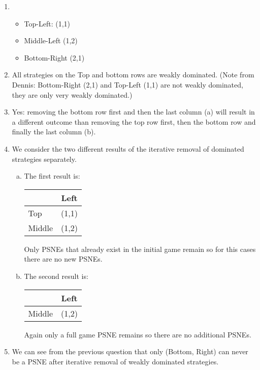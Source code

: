 \documentclass[../main.tex]{subfiles}
\begin{document}
\begin{solution}

    \begin{enumerate}
    	\item
    		\begin{itemize}
	    		\item Top-Left: (1,1)
	    		\item Middle-Left (1,2)
	    		\item Bottom-Right (2,1)
    		\end{itemize}
    	\item
    		All strategies on the Top and bottom rows are weakly dominated. (Note from Dennis:  Bottom-Right (2,1) and Top-Left (1,1) are not weakly dominated, they are only very weakly dominated.)
    	\item Yes: removing the bottom row first and then the last column (a) will result in a different outcome than removing the top row first, then the bottom row and finally the last column (b).
    	\item We consider the two different results of the iterative removal of dominated strategies separately.
			\begin{enumerate}[(a)]
				\item The first result is: \\
					\begin{center}
						\begin{tabular}{|l|c|}
							\hline
							& Left \\
							\hline
							Top & (1,1) \\
							\hline
							Middle & (1,2) \\
							\hline
						\end{tabular}
					\end{center}
					Only PSNEs that already exist in the initial game remain so for this cases there are no new PSNEs.
			\item  The second result is: \\
				\begin{center}
					\begin{tabular}{|l|c|}
						\hline
						& Left \\
						\hline
						Middle & (1,2) \\
						\hline
					\end{tabular}
				\end{center}
				Again only a full game PSNE remains so there are no additional PSNEs.
			\end{enumerate}
    	\item We can see from the previous question that only (Bottom, Right) can never be a PSNE after iterative removal of weakly dominated strategies.
    \end{enumerate}
\end{solution}
\end{document}
